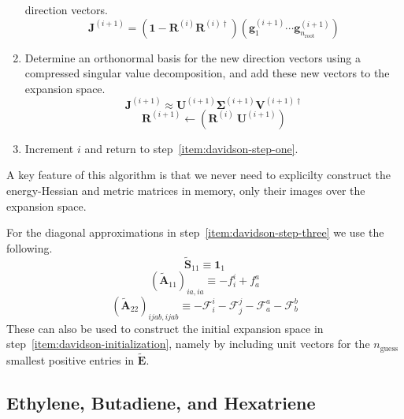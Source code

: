 \begin{enumerate}
        direction vectors.
        \[
            \mathbf{J}^{(i+1)}
            =
            (\mathbf{1} - \mathbf{R}^{(i)}\mathbf{R}^{(i)\dagger})
            (\mathbf{g}_1^{(i+1)}\cdots \mathbf{g}_{n_\mathrm{root}}^{(i+1)})
        \]
    \item
        Determine an orthonormal basis for the new direction vectors using a
        compressed singular value decomposition, and add these new vectors to
        the expansion space.
        \[
            \mathbf{J}^{(i+1)}
            \approx
            \mathbf{U}^{(i+1)}
            \boldsymbol\Sigma^{(i+1)}
            \mathbf{V}^{(i+1)\dagger}
        \]
        \[
            \mathbf{R}^{(i+1)}
            \leftarrow
            (\mathbf{R}^{(i)}\ \mathbf{U}^{(i+1)})
        \]
    \item
        Increment \(i\) and return to step~\ref{item:davidson-step-one}.
\end{enumerate}
A key feature of this algorithm is that we never need to explicilty construct
the energy-Hessian and metric matrices in memory, only their images over the
expansion space.

For the diagonal approximations in step~\ref{item:davidson-step-three} we use
the following.
\[
    \tilde{\mathbf{S}}_{11}
    \equiv
    \mathbf{1}_1
\]
\[
    (\tilde{\mathbf{A}}_{11})_{ia,ia}
    \equiv
    -
    f_i^i
    +
    f_a^a
\]
\[
    (\tilde{\mathbf{A}}_{22})_{ijab,ijab}
    \equiv
    -
    \mathcal{F}_i^i
    -
    \mathcal{F}_j^j
    -
    \mathcal{F}_a^a
    -
    \mathcal{F}_b^b
\]
These can also be used to construct the initial expansion space in
step~\ref{item:davidson-initialization}, namely by including unit vectors for
the \(n_\mathrm{guess}\) smallest positive entries in \(\tilde{\mathbf{E}}\).


\subsection{Ethylene, Butadiene, and Hexatriene}
\label{sec:alkenes}

